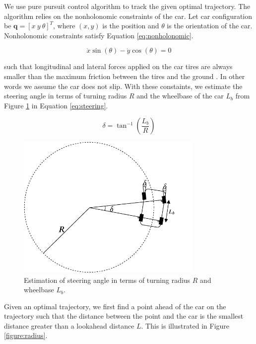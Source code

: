 We use pure pursuit control algorithm to track the given optimal trajectory.
The algorithm relies on the nonholonomic constraints of the car. Let car
configuration be $\textbf{q} = [x\ y\ \theta]^T$, where $(x, y)$ is the position
and $\theta$ is the orientation of the car. Nonholonomic constraints satisfy
Equation \eqref{eq:nonholonomic}.

\begin{equation}
  \dot{x}\sin(\theta) - \dot{y}\cos(\theta) = 0
  \label{eq:nonholonomic}
\end{equation}

such that longitudinal and lateral forces applied on the car tires are always
smaller than the maximum friction between the tires and the ground
\cite{Kim2013SensorbasedMP}. In other words we assume the car does not slip.
With these constaints, we estimate the steering angle in terms of turning radius
$R$ and the wheelbase of the car $L_b$ from Figure \ref{figure:steering} in
Equation \eqref{eq:steering}.

\begin{equation}
  \delta = \tan^{-1}(\frac{L_b}{R})
  \label{eq:steering}
\end{equation}

\begin{figure}[h]
  \centering
  \includegraphics[width=0.8\textwidth]{figures/pure-pursuit-steering.pdf}
  \caption[Steering angle geometry in pure pursuit controller]{Estimation of
    steering angle in terms of turning radius $R$ and wheelbase $L_b$.}
  \label{figure:steering}
\end{figure}

Given an optimal trajectory, we first find a point ahead of the car on the
trajectory such that the distance between the point and the car is the smallest
distance greater than a lookahead distance $L$. This is illustrated in Figure
\ref{figure:radius}.


